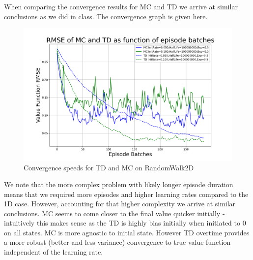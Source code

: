 \documentclass{article}[12pt]
\begin{document}
When comparing the convergence results for MC and TD we arrive at similar conclusions as we did in class. The convergence graph is given here.
\begin{figure}[h]
  \includegraphics[width=\linewidth]{conv_graph.png}
  \caption{Convergence speeds for TD and MC on RandomWalk2D}
  \label{fig:optPol1}
\end{figure}

We note that the more complex problem with likely longer episode duration means that we required more episodes and higher learning rates compared to the 1D case. However, accounting for that higher complexity we arrive at similar conclusions. MC seems to come closer to the final value quicker initially - intuitively this makes sense as the TD is highly bias initially when initiated to 0 on all states. MC is more agnostic to initial state. However TD overtime provides a more robust (better and less variance) convergence to true value function independent of the learning rate. 
\end{document}
